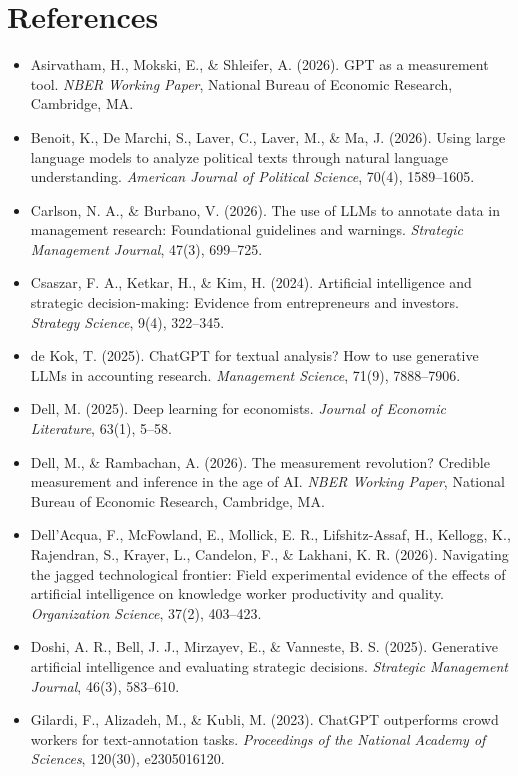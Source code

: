 \documentclass[11pt]{article}
\begin{document}
\section*{References}
\begin{itemize}
    \item Asirvatham, H., Mokski, E., \& Shleifer, A. (2026). GPT as a measurement tool. \textit{NBER Working Paper}, National Bureau of Economic Research, Cambridge, MA.
    \item Benoit, K., De Marchi, S., Laver, C., Laver, M., \& Ma, J. (2026). Using large language models to analyze political texts through natural language understanding. \textit{American Journal of Political Science}, 70(4), 1589--1605.
    \item Carlson, N. A., \& Burbano, V. (2026). The use of LLMs to annotate data in management research: Foundational guidelines and warnings. \textit{Strategic Management Journal}, 47(3), 699--725.
    \item Csaszar, F. A., Ketkar, H., \& Kim, H. (2024). Artificial intelligence and strategic decision-making: Evidence from entrepreneurs and investors. \textit{Strategy Science}, 9(4), 322--345.
    \item de Kok, T. (2025). ChatGPT for textual analysis? How to use generative LLMs in accounting research. \textit{Management Science}, 71(9), 7888--7906.
    \item Dell, M. (2025). Deep learning for economists. \textit{Journal of Economic Literature}, 63(1), 5--58.
    \item Dell, M., \& Rambachan, A. (2026). The measurement revolution? Credible measurement and inference in the age of AI. \textit{NBER Working Paper}, National Bureau of Economic Research, Cambridge, MA.
    \item Dell'Acqua, F., McFowland, E., Mollick, E. R., Lifshitz-Assaf, H., Kellogg, K., Rajendran, S., Krayer, L., Candelon, F., \& Lakhani, K. R. (2026). Navigating the jagged technological frontier: Field experimental evidence of the effects of artificial intelligence on knowledge worker productivity and quality. \textit{Organization Science}, 37(2), 403--423.
    \item Doshi, A. R., Bell, J. J., Mirzayev, E., \& Vanneste, B. S. (2025). Generative artificial intelligence and evaluating strategic decisions. \textit{Strategic Management Journal}, 46(3), 583--610.
    \item Gilardi, F., Alizadeh, M., \& Kubli, M. (2023). ChatGPT outperforms crowd workers for text-annotation tasks. \textit{Proceedings of the National Academy of Sciences}, 120(30), e2305016120.

\end{itemize}
\end{document}
